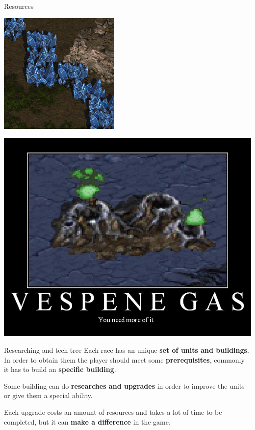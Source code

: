 \documentclass[10pt]{beamer}
\begin{document}
\begin{frame}{Resources}
\begin{center}
	  \includegraphics[scale=0.5]{min.jpg}
\end{center}
\begin{center}
	  \includegraphics[scale=0.2]{ves.jpg}
\end{center}
\end{frame}

\begin{frame}{Researching and tech tree}
      Each race has an unique \textbf{set of units and buildings}. In order to obtain them the player should meet some \textbf{prerequisites}, commonly it has to build an \textbf{specific building}.\newline

      Some building can do \textbf{researches and upgrades} in order to improve the units or give them a special ability. \newline

Each upgrade costs an amount of resources and takes a lot of time to be completed, but it can \textbf{make a difference} in the game.
\end{frame}
\end{document}
